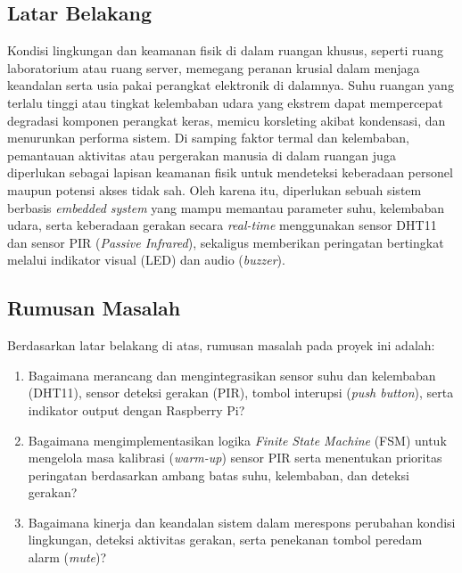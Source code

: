 \documentclass[12pt, a4paper]{article}
\begin{document}
\subsection{Latar Belakang}
Kondisi lingkungan dan keamanan fisik di dalam ruangan khusus, seperti ruang laboratorium atau ruang server, memegang peranan 
krusial dalam menjaga keandalan serta usia pakai perangkat elektronik di dalamnya. Suhu ruangan yang terlalu tinggi atau tingkat 
kelembaban udara yang ekstrem dapat mempercepat degradasi komponen perangkat keras, memicu korsleting akibat kondensasi, dan 
menurunkan performa sistem. Di samping faktor termal dan kelembaban, pemantauan aktivitas atau pergerakan manusia di dalam ruangan 
juga diperlukan sebagai lapisan keamanan fisik untuk mendeteksi keberadaan personel maupun potensi akses tidak sah. Oleh karena itu,
 diperlukan sebuah sistem berbasis \textit{embedded system} yang mampu memantau parameter suhu, kelembaban udara, serta keberadaan 
 gerakan secara \textit{real-time} menggunakan sensor DHT11 dan sensor PIR (\textit{Passive Infrared}), sekaligus memberikan 
 peringatan bertingkat melalui indikator visual (LED) dan audio (\textit{buzzer}).

\subsection{Rumusan Masalah}
Berdasarkan latar belakang di atas, rumusan masalah pada proyek ini adalah:
\begin{enumerate}
    \item Bagaimana merancang dan mengintegrasikan sensor suhu dan kelembaban (DHT11), sensor deteksi gerakan (PIR), tombol 
    interupsi (\textit{push button}), serta indikator output dengan Raspberry Pi?
    \item Bagaimana mengimplementasikan logika \textit{Finite State Machine} (FSM) untuk mengelola masa kalibrasi 
    (\textit{warm-up}) sensor PIR serta menentukan prioritas peringatan berdasarkan ambang batas suhu, kelembaban, dan deteksi 
    gerakan?
    \item Bagaimana kinerja dan keandalan sistem dalam merespons perubahan kondisi lingkungan, deteksi aktivitas gerakan, serta 
    penekanan tombol peredam alarm (\textit{mute})?
\end{enumerate}
\end{document}

